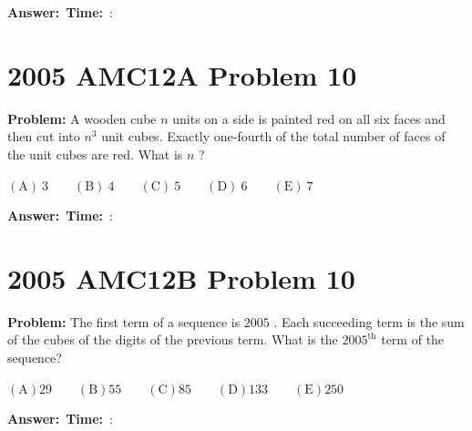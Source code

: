 \documentclass[12pt]{article}
\begin{document}
\vspace{0.3cm}
\noindent\textbf{Answer:}~\underline{\hspace{5cm}}\hfill\textbf{Time:}~\underline{\hspace{1.2cm}}:\underline{\hspace{1.2cm}}

\vspace{0.5cm}

\section{2005 AMC12A Problem 10}

\textbf{Problem:}
A wooden cube $n$ units on a side is painted red on all six faces and then cut into $n^3$ unit cubes. Exactly one-fourth of the total number of faces of the unit cubes are red. What is $n$ ?

$(\mathrm {A}) \ 3 \qquad (\mathrm {B}) \ 4 \qquad (\mathrm {C})\ 5 \qquad (\mathrm {D}) \ 6 \qquad (\mathrm {E})\ 7$

\vspace{0.3cm}
\noindent\textbf{Answer:}~\underline{\hspace{5cm}}\hfill\textbf{Time:}~\underline{\hspace{1.2cm}}:\underline{\hspace{1.2cm}}

\vspace{0.5cm}

\section{2005 AMC12B Problem 10}

\textbf{Problem:}
The first term of a sequence is $2005$ . Each succeeding term is the sum of the cubes of the digits of the previous term. What is the ${2005}^{\text{th}}$ term of the sequence?

$\mathrm{(A)} 29 \qquad \mathrm{(B)} 55 \qquad \mathrm{(C)} 85 \qquad \mathrm{(D)} 133 \qquad \mathrm{(E)} 250$

\vspace{0.3cm}
\noindent\textbf{Answer:}~\underline{\hspace{5cm}}\hfill\textbf{Time:}~\underline{\hspace{1.2cm}}:\underline{\hspace{1.2cm}}

\vspace{0.5cm}
\end{document}
